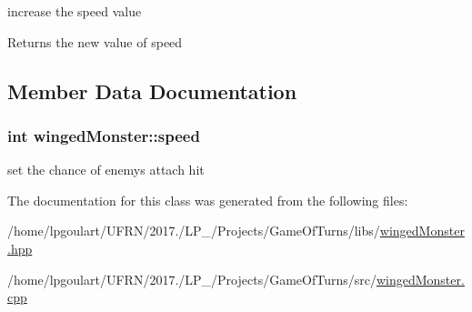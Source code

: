 increase the speed value 

\begin{DoxyReturn}{Returns}
the new value of speed 
\end{DoxyReturn}


\subsection{Member Data Documentation}
\subsubsection[{\texorpdfstring{speed}{speed}}]{\setlength{\rightskip}{0pt plus 5cm}int winged\+Monster\+::speed\hspace{0.3cm}{\ttfamily [private]}}\hypertarget{classwingedMonster_add58e2ea67dc81c40d2194b4f6f152a4}{}\label{classwingedMonster_add58e2ea67dc81c40d2194b4f6f152a4}


set the chance of enemy\textquotesingle{}s attach hit 



The documentation for this class was generated from the following files\+:\begin{DoxyCompactItemize}
\item 
/home/lpgoulart/\+U\+F\+R\+N/2017./\+L\+P\+\_/\+Projects/\+Game\+Of\+Turns/libs/\hyperlink{wingedMonster_8hpp}{winged\+Monster.\+hpp}\item 
/home/lpgoulart/\+U\+F\+R\+N/2017./\+L\+P\+\_/\+Projects/\+Game\+Of\+Turns/src/\hyperlink{wingedMonster_8cpp}{winged\+Monster.\+cpp}\end{DoxyCompactItemize}
